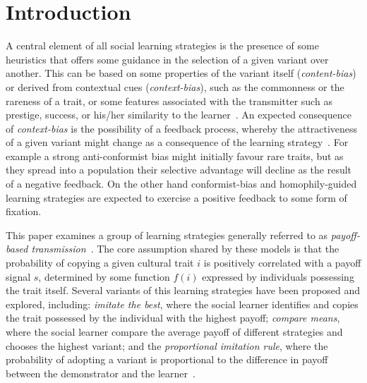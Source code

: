 \documentclass[preprint,authoryear]{elsarticle}
\begin{document}
\section{Introduction}



A central element of all social learning strategies is the presence of some heuristics that offers some guidance in the selection of a given variant over another. This  can be based on some properties of the variant itself (\emph{content-bias}) or derived from contextual cues (\emph{context-bias}), such as the commonness or the rareness of a trait, or some features associated with the transmitter such as prestige, success, or his/her similarity to the learner~\citep{henrich_mcelreath2003}. An expected consequence of \emph{context-bias} is the possibility of a feedback process, whereby the attractiveness of a given variant might change as a consequence of the learning strategy~\citep{kendal_etal_2009}. For example a strong anti-conformist bias might initially favour rare traits, but as they spread into a population their selective advantage will decline as the result of a negative feedback. On the other hand conformist-bias and homophily-guided learning strategies are expected to exercise a positive feedback to some form of fixation. 

This paper examines a group of learning strategies generally referred to as \emph{payoff-based transmission}~\citep{schlag1998,kendal_etal_2009,lake_and_crema_2012,baldini2013,kandler_and_laland_2013,crema_lake_inpress}. The core assumption shared by these models is that the probability of copying a given cultural trait $i$ is positively correlated with a payoff signal $s$, determined by some function $f(i)$ expressed by individuals possessing the trait itself. Several variants of this learning strategies have been proposed and explored, including: \emph{imitate the best}, where the social learner identifies and copies the trait possessed by the individual with the highest payoff; \emph{compare means}, where the social learner compare the average payoff of different strategies and chooses the highest variant; and the \emph{proportional imitation rule}, where the probability of adopting a variant is proportional to the difference in payoff between the demonstrator and the learner~\citep{schlag1998,baldini2013}. 
\end{document}
